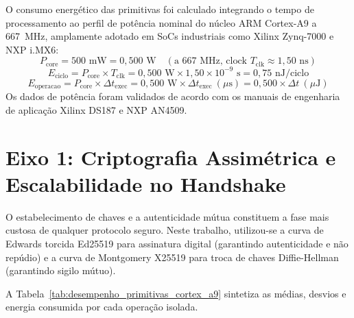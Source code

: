 O consumo energético das primitivas foi calculado integrando o tempo de processamento ao perfil de potência nominal do núcleo ARM Cortex-A9 a 667~MHz, amplamente adotado em SoCs industriais como Xilinx Zynq-7000 e NXP i.MX6:
\begin{equation}
    P_{\text{core}} = 500\text{ mW} = 0{,}500\text{ W} \quad (\text{a } 667\text{ MHz, clock } T_{\text{clk}} \approx 1{,}50\text{ ns})
\end{equation}
\begin{equation}
    E_{\text{ciclo}} = P_{\text{core}} \times T_{\text{clk}} = 0{,}500\text{ W} \times 1{,}50\times 10^{-9}\text{ s} = 0{,}75\text{ nJ/ciclo}
\end{equation}
\begin{equation}
    E_{\text{operacao}} = P_{\text{core}} \times \Delta t_{\text{exec}} = 0{,}500\text{ W} \times \Delta t_{\text{exec}}~(\mu\text{s}) = 0{,}500 \times \Delta t~(\mu\text{J})
\end{equation}
Os dados de potência foram validados de acordo com os manuais de engenharia de aplicação Xilinx DS187 e NXP AN4509.

\section{Eixo 1: Criptografia Assimétrica e Escalabilidade no Handshake}
\label{sec:eixo1_assimetrica}

O estabelecimento de chaves e a autenticidade mútua constituem a fase mais custosa de qualquer protocolo seguro. Neste trabalho, utilizou-se a curva de Edwards torcida Ed25519 para assinatura digital (garantindo autenticidade e não repúdio) e a curva de Montgomery X25519 para troca de chaves Diffie-Hellman (garantindo sigilo mútuo).

A Tabela~\ref{tab:desempenho_primitivas_cortex_a9} sintetiza as médias, desvios e energia consumida por cada operação isolada.

